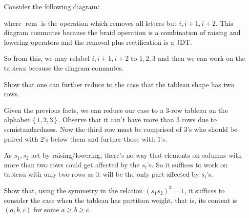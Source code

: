 \documentclass[12pt]{memoir}
\begin{document}
\begin{ptcbr}
Consider the following diagram:
\begin{center}
\end{center}
where $\operatorname{rem}$ is the operation which removes all letters but $i,i+1,i+2$. This diagram commutes because the braid operation is a combination of raising and lowering operators and the removal plus rectification is a JDT.\par
So from this, we may relabel $i,i+1,i+2$ to $1,2,3$ and then we can work on the tableau because the diagram commutes.
\end{ptcbr}

\begin{Ej}[Exercise 1.d]
    Show that one can further reduce to the case that the tableau shape has two rows.
\end{Ej}

\begin{ptcbr}
    Given the previous facts, we can reduce our case to a $3$-row tableau on the alphabet $\{\,1,2,3\,\}$. Observe that it can't have more than $3$ rows due to semistandardness. Now the third row must be comprised of $3$'s who should be paired with $2$'s below them and further those with $1$'s.\par
    As $s_1,s_2$ act by raising/lowering, there's no way that elements on columns with more than two rows could get affected by the $s_i$'s. So it suffices to work on tableau with only two rows as it will be the only part affected by $s_i$'s.
\end{ptcbr}

\begin{Ej}[Exercise 1.e]
    Show that, using the symmetry in the relation $(s_1s_2)^3=1$, it suﬃces to consider the
case when the tableau has partition weight, that is, its content is $(a, b, c)$ for some $a\geq b\geq c$.
\end{Ej}
\end{document}
